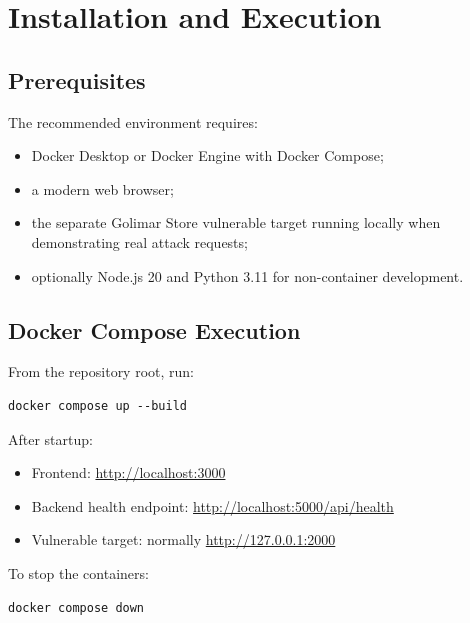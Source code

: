 \documentclass[12pt,a4paper]{article}
\begin{document}
\section{Installation and Execution}

\subsection{Prerequisites}

The recommended environment requires:

\begin{itemize}[leftmargin=1.4cm]
    \item Docker Desktop or Docker Engine with Docker Compose;
    \item a modern web browser;
    \item the separate Golimar Store vulnerable target running locally when demonstrating real attack requests;
    \item optionally Node.js 20 and Python 3.11 for non-container development.
\end{itemize}

\subsection{Docker Compose Execution}

From the repository root, run:

\begin{lstlisting}[caption={Starting the project with Docker Compose}]
docker compose up --build
\end{lstlisting}

After startup:

\begin{itemize}[leftmargin=1.4cm]
    \item Frontend: \url{http://localhost:3000}
    \item Backend health endpoint: \url{http://localhost:5000/api/health}
    \item Vulnerable target: normally \url{http://127.0.0.1:2000}
\end{itemize}

To stop the containers:

\begin{lstlisting}[caption={Stopping the project}]
docker compose down
\end{lstlisting}
\end{document}
